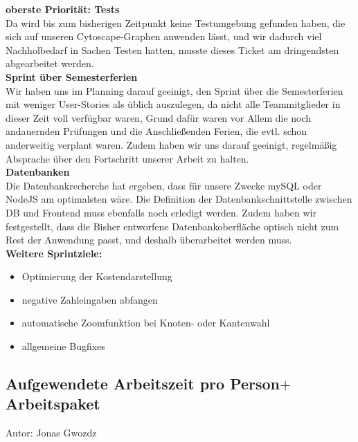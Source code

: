 \begin{itemize}
\textbf{oberste Priorität: Tests}\\
Da wird bis zum bisherigen Zeitpunkt keine Testumgebung gefunden haben, die sich auf unseren Cytoscape-Graphen anwenden lässt, und wir dadurch viel Nachholbedarf in Sachen Testen hatten, musste dieses Ticket am dringendsten abgearbeitet werden.\\

\textbf{Sprint über Semesterferien}\\
Wir haben uns im Planning darauf geeinigt, den Sprint über die Semesterferien mit weniger User-Stories als üblich auszulegen, da nicht alle Teammitglieder in dieser Zeit voll verfügbar waren, Grund dafür waren vor Allem die noch andauernden Prüfungen und die Anschließenden Ferien, die evtl. schon anderweitig verplant waren. Zudem haben wir uns darauf geeinigt, regelmäßig Absprache über den Fortschritt unserer Arbeit zu halten.\\

\textbf{Datenbanken}\\
Die Datenbankrecherche hat ergeben, dass für unsere Zwecke mySQL oder NodeJS am optimalsten wäre. Die Definition der Datenbankschnittstelle zwischen DB und Frontend muss ebenfalls noch erledigt werden. Zudem haben wir festgestellt, dass die Bisher entworfene Datenbankoberfläche optisch nicht zum Rest der Anwendung passt, und deshalb überarbeitet werden muss.\\

\textbf{Weitere Sprintziele:}
\begin{itemize}
\item Optimierung der Kostendarstellung
\item negative Zahleingaben abfangen
\item automatische Zoomfunktion bei Knoten- oder Kantenwahl
\item allgemeine Bugfixes
\end{itemize}


\subsection{Aufgewendete Arbeitszeit pro Person$+$Arbeitspaket}
{\small Autor: Jonas Gwozdz}


\end{itemize}
